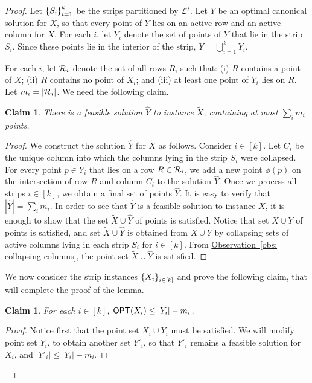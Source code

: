 \documentclass[11pt]{article}
\numberwithin{equation}{section}
\newtheorem{claim}[theorem]{Claim}
\theoremstyle{definition}
\theoremstyle{plain}
\newcommand{\expref}[2]{\hyperref[#2]{#1~\ref{#2}}}
\begin{document}
\begin{proof}        

Let $\left\{ S_i \right\}_{i=1}^k$ be the strips partitioned by ${\mathcal L}'$. 
Let $Y$ be an optimal canonical solution for $X$, so that every point of $Y$ lies on an active row and an active column for $X$. For each $i$, let $Y_i$ denote the set of points of $Y$ that lie in the strip $S_i$. Since these points  lie in the interior of the strip,  $Y = \bigcup_{i=1}^k Y_i$. 
        
        
        For each $i$, let ${\mathcal R}_i$ denote the set of all rows $R$, such that: (i) $R$ contains a point of $X$; (ii) $R$ contains no point of $X_i$; and (iii) at least one point of $Y_i$ lies on $R$. Let $m_i=|{\mathcal R}_i|$.
      We need the following claim.
         
        \begin{claim}
                There is a feasible solution $\hat{Y}$ to instance $\tilde{X}$, containing at most $\sum_{i} m_i$ points. 
        \end{claim}
        \begin{proof}
                We construct the solution $\hat{Y}$ for $\tilde{X}$ as follows. 
                Consider $i \in [k]$. Let $C_i$ be the unique column into which the columns lying in the strip $S_i$ were collapsed. For every point $p\in Y_i$ that lies on a row $R\in{\mathcal R}_i$, we add a new point $\phi(p)$ on the intersection of row $R$ and column $C_i$ to the solution $\hat Y$. Once we process all strips $i \in [k]$, we obtain a final set of points $\hat Y$. It is easy to verify that  $|\hat{Y}| = \sum_i m_i$. 
In order to see that $\hat Y$ is a feasible solution to instance $\tilde{X}$, it is enough to show that the set $\tilde{X}\cup \hat Y$ of points is satisfied. 
Notice that set $X\cup Y$ of points is satisfied, and set $\tilde{X}\cup \hat Y$ is obtained from $X\cup Y$ by collapsing sets of active columns lying in each strip $S_i$ for $i \in [k]$. 
From \expref{Observation}{obs: collapsing columns}, the point set $\tilde{X}\cup \hat Y$ is satisfied.  
\end{proof}
        
        We now consider the strip instances $\left\{ X_i \right\}_{i\in [k]}$ and prove the following claim, that will complete the proof of the lemma. 
        
        \begin{claim}\label{claim:opt y-m}
                For each $i \in [k]$, $\mbox{\sf OPT}(X_i) \leq |Y_i| - m_i$. 
        \end{claim}
       \begin{proof}
                Notice first that the point set $X_i \cup Y_i$ must be satisfied. 
                We will modify point set $Y_i$, to obtain another set $Y'_i$, so that $Y'_i$ remains a feasible solution for $X_i$, and $|Y'_i| \le |Y_i| - m_i$.
                

\end{proof}
\end{proof}
\end{document}
